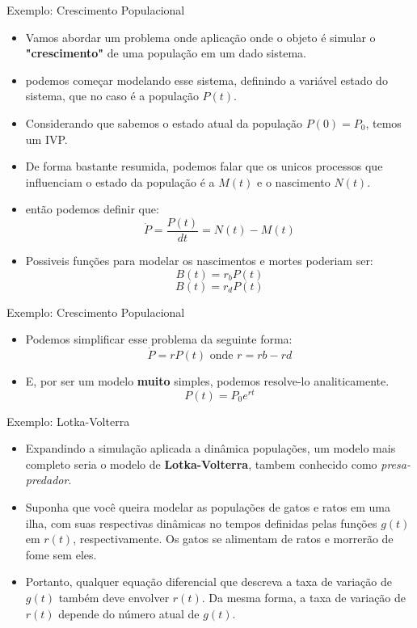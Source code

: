 \documentclass{beamer}
\begin{document}
		\begin{frame}{Exemplo: Crescimento Populacional}
			\begin{itemize}[<+->]
				\item Vamos abordar um problema onde aplicação onde o objeto é simular o \textbf{"crescimento"} de uma população em um dado sistema.
				\item podemos começar modelando esse sistema, definindo a variável estado do sistema, que no caso é a população $P(t)$.
				\item Considerando que sabemos o estado atual da população $P(0)=P_0$, temos um IVP.
				\item De forma bastante resumida, podemos falar que os unicos processos que influenciam o estado da população é a $M(t)$ e o nascimento $N(t)$.
				\item então podemos definir que:
					\begin{equation}
						\dot{P}= \frac{P(t)}{dt} = N(t)-M(t)
					\end{equation}
				\item Possiveis funções para modelar os nascimentos e mortes poderiam ser:
					\begin{equation}
						B(t)=r_bP(t)
					\end{equation}
					\begin{equation}
						B(t)=r_dP(t)
					\end{equation}
			\end{itemize}
		\end{frame}
		\begin{frame}{Exemplo: Crescimento Populacional}
			\begin{itemize}[<+->]
				\item Podemos simplificar esse problema da seguinte forma:
					\begin{equation}
						\dot{P}=rP(t) \text{ onde } r=rb-rd
					\end{equation}
				\item E, por ser um modelo \textbf{muito} simples, podemos resolve-lo analiticamente.
					\begin{equation}
						P(t)=P_0e^{rt}
					\end{equation}
			\end{itemize}
		\end{frame}
		\begin{frame}{Exemplo: Lotka-Volterra}
			\begin{itemize}[<+->]
				\item Expandindo a simulação aplicada a dinâmica populações, um modelo mais completo seria o modelo de \textbf{Lotka-Volterra}, tambem conhecido como \emph{presa-predador}.
				\item Suponha que você queira modelar as populações de gatos e ratos em uma ilha, com suas respectivas dinâmicas no tempos definidas pelas funções $g(t)$ em $r(t)$, respectivamente. Os gatos se alimentam de ratos e morrerão de fome sem eles.
				\item Portanto, qualquer equação diferencial que descreva a taxa de variação de $g(t)$ também deve envolver $r(t)$. Da mesma forma, a taxa de variação de $r(t)$ depende do número atual de $g(t)$.
			\end{itemize}
		\end{frame}
\end{document}
